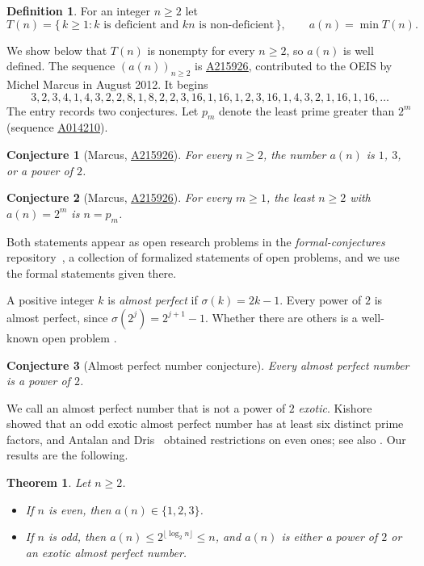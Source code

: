 \documentclass[12pt,reqno]{article}
\newcommand{\seqnum}[1]{\href{https://oeis.org/#1}{\rm \underline{#1}}}
\theoremstyle{plain}
\newtheorem{theorem}{Theorem}
\newtheorem{conjecture}{Conjecture}
\theoremstyle{definition}
\newtheorem*{definition}{Definition}
\theoremstyle{remark}
\begin{document}
\begin{definition}
For an integer $n \ge 2$ let
\[
  T(n) = \{\, k \ge 1 : k \text{ is deficient and } kn \text{ is non-deficient} \,\},
  \qquad a(n) = \min T(n).
\]
\end{definition}

We show below that $T(n)$ is nonempty for every $n \ge 2$, so $a(n)$ is well
defined. The sequence $(a(n))_{n \ge 2}$ is \seqnum{A215926}, contributed to the
OEIS by Michel Marcus in August 2012. It begins
\[
 3, 2, 3, 4, 1, 4, 3, 2, 2, 8, 1, 8, 2, 2, 3, 16, 1, 16, 1, 2, 3, 16, 1, 4, 3, 2, 1, 16, 1, 16, \ldots
\]
The entry records two conjectures. Let $p_m$ denote the least prime greater than
$2^m$ (sequence \seqnum{A014210}).

\begin{conjecture}[Marcus, \seqnum{A215926}]\label{conj:one}
For every $n \ge 2$, the number $a(n)$ is $1$, $3$, or a power of $2$.
\end{conjecture}

\begin{conjecture}[Marcus, \seqnum{A215926}]\label{conj:two}
For every $m \ge 1$, the least $n \ge 2$ with $a(n) = 2^m$ is $n = p_m$.
\end{conjecture}

Both statements appear as open research problems in the
\emph{formal-conjectures} repository~\cite{fc}, a collection of formalized
statements of open problems, and we use the formal statements given there.

A positive integer $k$ is \emph{almost perfect} if $\sigma(k) = 2k-1$. Every
power of $2$ is almost perfect, since $\sigma(2^j) = 2^{j+1}-1$. Whether there
are others is a well-known open problem \cite[Section B2]{guy}.

\begin{conjecture}[Almost perfect number conjecture]\label{conj:ap}
Every almost perfect number is a power of $2$.
\end{conjecture}

We call an almost perfect number that is not a power of $2$ \emph{exotic}.
Kishore~\cite[Proposition~4]{kishore78} showed that an odd exotic almost perfect
number has at least six distinct prime factors, and Antalan and
Dris~\cite{antalan-dris} obtained restrictions on even ones; see also
\cite{dris}. Our results are the following.

\begin{theorem}\label{thm:structure}
Let $n \ge 2$.
\begin{itemize}
\item[(a)] If $n$ is even, then $a(n) \in \{1,2,3\}$.
\item[(b)] If $n$ is odd, then $a(n) \le 2^{\lfloor \log_2 n \rfloor} \le n$, and
$a(n)$ is either a power of $2$ or an exotic almost perfect number.
\end{itemize}
\end{theorem}
\end{document}
